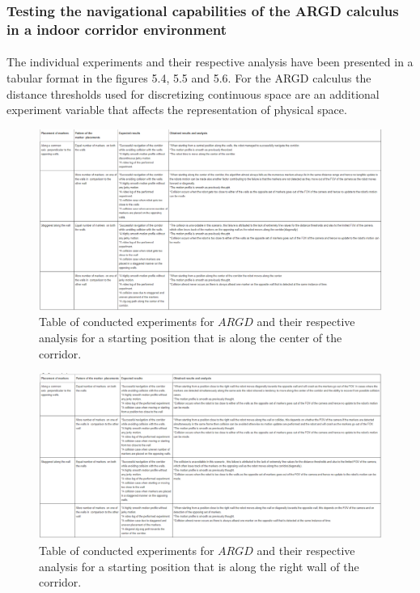 \subsubsection{Testing the navigational capabilities of the ARGD calculus in a indoor corridor environment} 
\paragraph{}The individual experiments and their respective analysis have been presented in a tabular format in the figures 5.4, 5.5 and 5.6. For the ARGD calculus the distance thresholds used for discretizing continuous space are an additional experiment variable that affects the representation of physical space.

\begin{figure}
	\centering
	\includegraphics[scale = 0.6]{images/argd_center}
	\caption{Table of conducted experiments for $ARGD$ and their respective analysis for a starting position that is along the center of the corridor.}
	\label{fig:argdcenter}
\end{figure}


\begin{figure}
	\centering
	\includegraphics[scale = 0.6]{images/argd_right}
	\caption{Table of conducted experiments for $ARGD$ and their respective analysis for a starting position that is along the right wall of the corridor.}
	\label{fig:argdright}
\end{figure}

